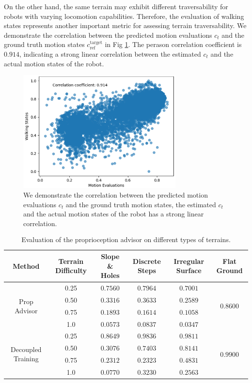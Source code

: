 \documentclass[conference]{IEEEtran}
\begin{document}
On the other hand, the same terrain may exhibit different traversability for robots with varying locomotion capabilities. Therefore, the evaluation of walking states represents another important metric for assessing terrain traversability. We demonstrate the correlation between the predicted motion evaluations $c_t$ and the ground truth motion states $c^\textrm{target}_\textrm{ref}$ in Fig \ref{correlation}. The perason correlation coefficient is $0.914$, indicating a strong linear correlation between the estimated $c_t$ and the actual motion states of the robot.

\begin{figure}[htbp]
\centerline{\includegraphics[width=8.3cm]{figures/linear_correlation.pdf}}
\caption{We demonstrate the correlation between the predicted motion evaluations $c_t$ and the ground truth motion states, the estimated $c_t$ and the actual motion states of the robot has a strong linear correlation.}
\label{correlation}
\end{figure}

\begin{table}[t]
\small
\renewcommand{\arraystretch}{1.3}
\caption{Evaluation of the proprioception advisor on different types of terrains.}
\begin{center}
\begin{tabular}{c|c|c c c|c} 
\hline
\textbf{Method}&\textbf{Terrain Difficulty}&{Slope \& Holes}&{Discrete Steps} &{Irregular Surface} & Flat Ground\\
\hline
\multirow{4}{*}{Prop Advisor}&0.25& $0.7560$& $0.7964$& $0.7001$ & \multirow{4}{*}{$0.8600$}\\
&0.50& $0.3316$& $0.3633$& $0.2589$&\\
&0.75& $0.1893$& $0.1614$& $0.1058$&\\
&1.0 & $0.0573$& $0.0837$& $0.0347$&\\
\hline\multirow{4}{*}{Decoupled Training}&0.25& $0.8649$& $0.9836$& $0.9811$ & \multirow{4}{*}{$0.9900$}\\
&0.50& $0.3076$& $0.7403$& $0.8141$&\\
&0.75& $0.2312$& $0.2323$& $0.4831$&\\
&1.0 & $0.0770$& $0.3230$& $0.2563$&\\
\hline
\end{tabular}
\label{Proprioception Advisor outputs}
\end{center}
\end{table}
\end{document}
